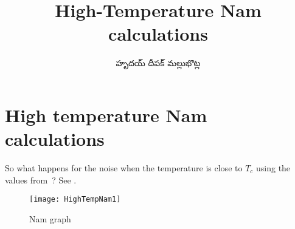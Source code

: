 \documentclass[../main.tex]{subfiles}
\title{High-Temperature Nam calculations}
\author{\begin{telugu}హృదయ్ దీపక్ మల్లుభొట్ల\end{telugu}}
\date{}
\begin{document}
	\graphicspath{{\main/figures/}}

	\onlyinsubfile{\maketitle}

	\section{High temperature Nam calculations} \label{sec:htn:intro}

	So what happens for the noise when the temperature is close to $T_c$ using the values from~\cite{Nam1967}?
	See .

	\begin{figure}[htp]
		\centering
		\texttt{[image: HighTempNam1]}
		\caption{Nam graph} \label{fig:htn:1}
	\end{figure}
\end{document}
